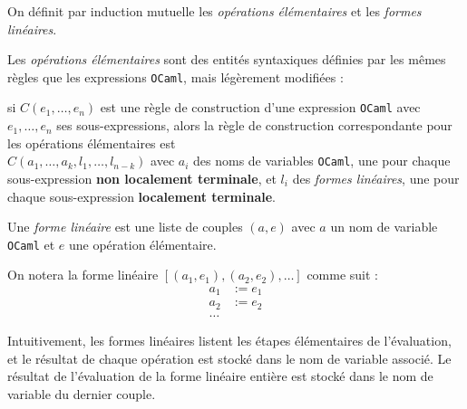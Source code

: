 \begin{definition} On définit par induction mutuelle les
    \textit{opérations élémentaires} et les \textit{formes linéaires}.


    Les \textit{opérations élémentaires} sont des entités syntaxiques définies
    par les mêmes règles que les expressions \texttt{OCaml}, mais légèrement
    modifiées :

    si $C(e_1, \ldots, e_n)$ est une règle de construction d'une expression
    \texttt{OCaml} avec $e_1, \ldots, e_n$ ses sous-expressions, alors la règle
    de construction correspondante pour les opérations élémentaires est \\
    $C(a_1, \ldots, a_k, l_1, \ldots, l_{n - k})$ avec $a_i$ des noms de
    variables \texttt{OCaml}, une pour chaque sous-expression
    \textbf{non localement terminale}, et $l_i$ des \textit{formes linéaires},
    une pour chaque sous-expression \textbf{localement terminale}.

    Une \textit{forme linéaire} est une liste de couples $(a, e)$ avec $a$ un
    nom de variable \texttt{OCaml} et $e$ une opération élémentaire.
\end{definition}

On notera la forme linéaire $[(a_1, e_1), (a_2, e_2), \ldots]$ comme suit :
\begin{align*}
    a_1 & := e_1 \\
    a_2 & := e_2 \\
    \ldots
\end{align*}

\begin{remark}
    Intuitivement, les formes linéaires listent les étapes élémentaires de
    l'évaluation, et le résultat de chaque opération est stocké dans le nom de
    variable associé. Le résultat de l'évaluation de la forme linéaire entière
    est stocké dans le nom de variable du dernier couple.
\end{remark}

